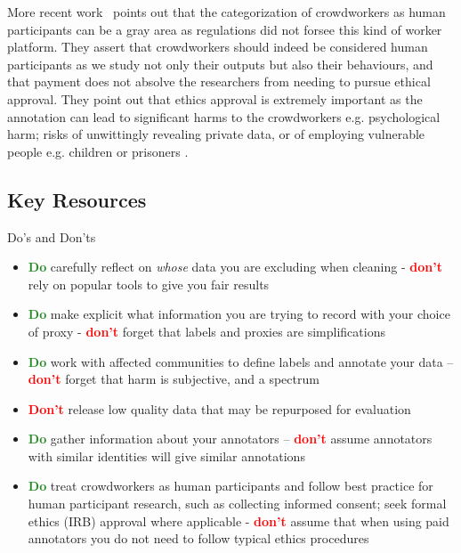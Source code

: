 More recent work~\citep{shmueli_beyond_2021} points out that the categorization of crowdworkers as human participants can be a gray area as regulations did not forsee this kind of worker platform. 
They assert that crowdworkers should indeed be considered human participants as we study not only their outputs but also their behaviours, and that payment does not absolve the researchers from needing to pursue ethical approval. They point out that ethics approval is extremely important as the annotation can lead to significant harms to the crowdworkers e.g. psychological harm; risks of unwittingly revealing private data, or of employing vulnerable people e.g. children or prisoners \citep{kaun_prison_2020, mason_conducting_2012}. 


\subsection{Key Resources}
Do's and Don'ts
\begin{itemize}
    \item \textcolor{ForestGreen}{\textbf{Do}} carefully reflect on \textit{whose} data you are excluding when cleaning - \textcolor{red}{\textbf{don't}} rely on popular tools to give you fair results
    \item \textcolor{ForestGreen}{\textbf{Do}} make explicit what information you are trying to record with your choice of proxy - \textcolor{red}{\textbf{don't}} forget that labels and proxies are simplifications  
    \item \textcolor{ForestGreen}{\textbf{Do}} work with affected communities to define labels and annotate your data -- \textcolor{red}{\textbf{don't}} forget that harm is subjective, and a spectrum 
    \item  \textcolor{red}{\textbf{Don't}} release low quality data that may be repurposed for evaluation
    \item \textcolor{ForestGreen}{\textbf{Do}} gather information about your annotators -- \textcolor{red}{\textbf{don't}} assume annotators with similar identities will give similar annotations
    \item \textcolor{ForestGreen}{\textbf{Do}} treat crowdworkers as human participants and follow best practice for human participant research, such as collecting informed consent; seek formal ethics (IRB) approval where applicable - \textcolor{red}{\textbf{don't}} assume that when using paid annotators you do not need to follow typical ethics procedures
\end{itemize}

